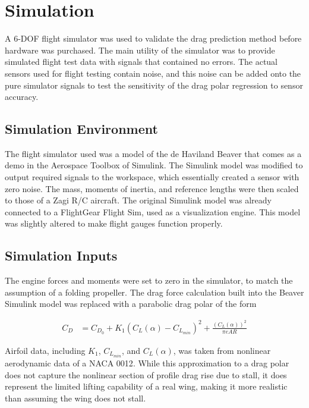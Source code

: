 \chapter{Simulation}
\label{simulation}
A 6-DOF flight simulator was used to validate the drag prediction method before hardware was purchased. The main utility of the simulator was to provide simulated flight test data with signals that contained no errors. The actual sensors used for flight testing contain noise, and this noise can be added onto the pure simulator signals to test the sensitivity of the drag polar regression to sensor accuracy.

\section{Simulation Environment}
The flight simulator used was a model of the de Haviland Beaver that comes as a demo in the Aerospace Toolbox of Simulink. The Simulink model was modified to output required signals to the workspace, which essentially created a sensor with zero noise. The mass, moments of inertia, and reference lengths were then scaled to those of a Zagi R/C aircraft\cite{stevens2003aircraft}. The original Simulink model was already connected to a FlightGear Flight Sim, used as a visualization engine. This model was slightly altered to make flight gauges function properly.

\section{Simulation Inputs}
The engine forces and moments were set to zero in the simulator, to match the assumption of a folding propeller.
The drag force calculation built into the Beaver Simulink model was replaced with a parabolic drag polar of the form

\begin{align}
C_D &= C_{D_0} + K_1(C_L(\alpha)-C_{L_{min}})^2+\frac{(C_L(\alpha))^2}{\pi eAR}
\end{align}

Airfoil data, including $K_1$, $C_{L_{min}}$, and $C_L(\alpha)$, was taken from nonlinear aerodynamic data of a NACA 0012\cite{osborne2007transitions}. While this approximation to a drag polar does not capture the nonlinear section of profile drag rise due to stall, it does represent the limited lifting capability of a real wing, making it more realistic than assuming the wing does not stall.
